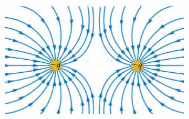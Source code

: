 \documentclass{beamer}
\begin{document}
\begin{frame}
\begin{columns}
        \begin{alertblock}{  2}
            \begin{figure}
                \centering
                \includegraphics[width=1\linewidth]{phys11-electrostatics-field-lines-like-charges.png}
            \end{figure}
        \end{alertblock}
    \end{columns}
\end{frame}
\end{document}

